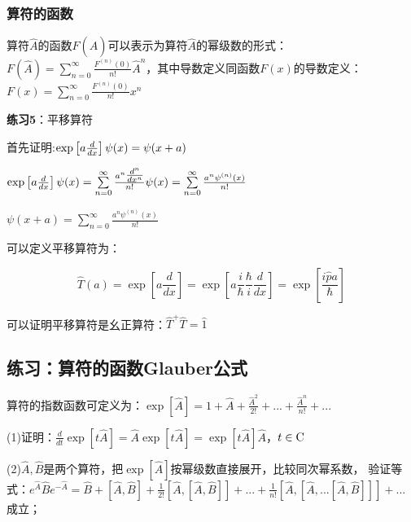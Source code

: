 \subsubsection{算符的函数}


算符$\hat A$的函数$F(\hat A)$可以表示为算符$\hat A$的幂级数的形式：$F(\hat A) = \sum\limits_{n = 0}^\infty  {\frac{{F^{(n)} \left( 0 \right)}}{{n!}}\hat A^n } $，其中导数定义同函数$F(x)$的导数定义：$F(x) = \sum\limits_{n = 0}^\infty  {\frac{{F^{(n)} \left( 0 \right)}}{{n!}}x^n } $


\textbf{练习5}：平移算符


首先证明:$\exp \left[ {a{\textstyle{d \over {dx}}}} \right]\psi (x) = \psi (x + a)$

$\exp \left[ {a{\textstyle{d \over {dx}}}} \right]\psi (x) = \sum\limits_{n = 0}^\infty  {\frac{{a^n {\textstyle{{d^n } \over {dx^n }}}}}{{n!}}} \psi (x) = \sum\limits_{n = 0}^\infty  {\frac{{a^n \psi ^{(n)} (x)}}{{n!}}} $

$\psi (x + a) = \sum\limits_{n = 0}^\infty  {\frac{{a^n \psi ^{(n)} (x)}}{{n!}}} $

可以定义平移算符为：

\begin{equation}
\hat T(a) = \exp \left[ {a\frac{d}{{dx}}} \right] = \exp \left[ {a\frac{i}{\hbar }\frac{\hbar }{i}\frac{d}{{dx}}} \right] = \exp \left[ {\frac{{i\hat pa}}{\hbar }} \right]
\end{equation}

可以证明平移算符是幺正算符：$\hat T^ +  \hat T = \hat 1$

\subsection{练习：算符的函数Glauber公式}


算符的指数函数可定义为：$\exp \left[ {\hat A} \right] = 1 + \hat A + \frac{{\hat A^2 }}{{2!}} + ... + \frac{{\hat A^n }}{{n!}} + ...$

(1)证明：$\frac{d}{{dt}}\exp \left[ {t\hat A} \right] = \hat A\exp \left[ {t\hat A} \right] = \exp \left[ {t\hat A} \right]\hat A$，$t \in {\rm{C}}$

(2)$\hat A, \hat B$是两个算符，把$\exp \left[ {\hat A} \right]$按幂级数直接展开，比较同次幂系数，
验证等式：$e^{\hat A} \hat Be^{ - \hat A}  = \hat B + \left[ {\hat A,\hat B} \right] + \frac{1}{{2!}}\left[ {\hat A,\left[ {\hat A,\hat B} \right]} \right] + ... + \frac{1}{{n!}}\left[ {\hat A,\left[ {\hat A,...\left[ {\hat A,\hat B} \right]} \right]} \right] + ...$成立；


